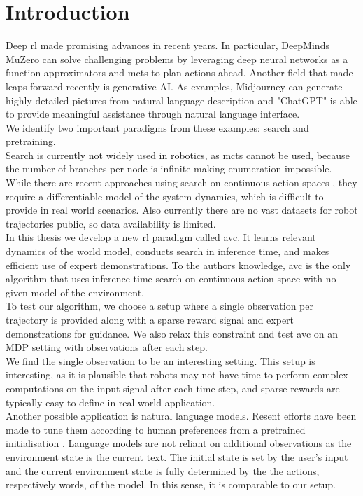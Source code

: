 \chapter{Introduction}
\label{chapter:Introduction}
Deep \ac{rl} made promising advances in recent years. In particular, DeepMinds MuZero \cite{MUZero} can solve challenging problems by leveraging deep neural networks as a function 
approximators and \ac{mcts} to plan actions ahead. 
Another field that made leaps forward recently is generative AI. As examples, Midjourney \cite{midjourney} 
can generate highly detailed pictures from natural 
language description and "ChatGPT" is able to provide meaningful assistance through natural language interface. \\
We identify two important paradigms from these examples: search and pretraining. \\
Search is currently not widely used in robotics, as \ac{mcts} cannot be used, because the number of branches per node is infinite making enumeration impossible. While there are recent approaches 
using search on continuous action spaces \cite{Manna2022} \cite{Lee_Jeon_Kim_Kim_2020}, they require a differentiable model of the system dynamics, which is difficult to provide in real world scenarios. 
Also currently there are no vast datasets for robot trajectories public, so data availability is limited.\\ 
In this thesis we develop a new \ac{rl} 
paradigm called \ac{avc}. It learns relevant dynamics of the world model, conducts search in inference time, and makes efficient use of expert demonstrations. 
To the authors knowledge, \ac{avc} is the only algorithm that uses inference time search on continuous action space with no given model of the environment.\\
To test our algorithm, we choose a setup where a single observation per trajectory is provided along with a sparse reward signal and expert demonstrations for guidance. 
We also relax this constraint and test \ac{avc} on an MDP setting with observations after each step.\\

We find the single observation to be an interesting setting. This setup is interesting, as it is plausible that robots may not have time to perform complex computations 
on the input signal after each time step, and sparse rewards are typically easy to define in real-world application.\\
Another possible application is natural language models. Resent efforts have been made to tune 
them according to human preferences from a pretrained initialisation \cite{cite:ChatGPT}. Language models are not reliant on additional observations as the environment state is the current 
text. The initial state is set by the user's input and the current environment state is fully determined by the the actions, respectively words, of the model. 
In this sense, it is comparable to our setup.\\


